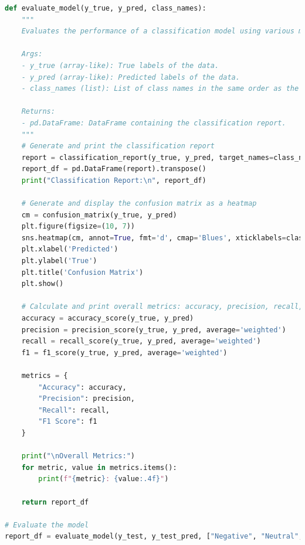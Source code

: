 \documentclass{solutionclass} %
\begin{document}
\begin{lstlisting}[language=Python]
	def evaluate_model(y_true, y_pred, class_names):
    """
    Evaluates the performance of a classification model using various metrics and visualizations.

    Args:
    - y_true (array-like): True labels of the data.
    - y_pred (array-like): Predicted labels of the data.
    - class_names (list): List of class names in the same order as the confusion matrix.

    Returns:
    - pd.DataFrame: DataFrame containing the classification report.
    """
    # Generate and print the classification report
    report = classification_report(y_true, y_pred, target_names=class_names, output_dict=True)
    report_df = pd.DataFrame(report).transpose()
    print("Classification Report:\n", report_df)

    # Generate and display the confusion matrix as a heatmap
    cm = confusion_matrix(y_true, y_pred)
    plt.figure(figsize=(10, 7))
    sns.heatmap(cm, annot=True, fmt='d', cmap='Blues', xticklabels=class_names, yticklabels=class_names)
    plt.xlabel('Predicted')
    plt.ylabel('True')
    plt.title('Confusion Matrix')
    plt.show()

    # Calculate and print overall metrics: accuracy, precision, recall, and F1 score
    accuracy = accuracy_score(y_true, y_pred)
    precision = precision_score(y_true, y_pred, average='weighted')
    recall = recall_score(y_true, y_pred, average='weighted')
    f1 = f1_score(y_true, y_pred, average='weighted')

    metrics = {
        "Accuracy": accuracy,
        "Precision": precision,
        "Recall": recall,
        "F1 Score": f1
    }

    print("\nOverall Metrics:")
    for metric, value in metrics.items():
        print(f"{metric}: {value:.4f}")
    
    return report_df

# Evaluate the model
report_df = evaluate_model(y_test, y_test_pred, ["Negative", "Neutral", "Positive"])
\end{lstlisting}
\end{document}
